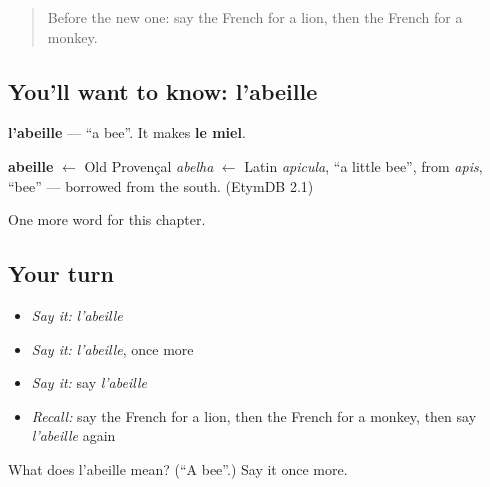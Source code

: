 \begin{quote}
Before the new one: say the French for a lion, then the French for a monkey.
\end{quote}

\subsection*{You'll want to know: l'abeille}
\textbf{l'abeille} — \textquotedblleft{}a bee\textquotedblright{}. It makes \textbf{le miel}.

\begin{cousinweb}
\textbf{abeille} $\leftarrow$ Old Provençal \emph{abelha} $\leftarrow$ Latin \emph{apicula}, \textquotedblleft{}a little bee\textquotedblright{}, from \emph{apis}, \textquotedblleft{}bee\textquotedblright{} — borrowed from the south. (EtymDB 2.1)
\end{cousinweb}

\begin{grammarlens}[title={What you've built}]
One more word for this chapter.
\end{grammarlens}

\subsection*{Your turn}
\begin{itemize}
\raggedright
  \item \emph{Say it:} \emph{l'abeille}
  \item \emph{Say it:} \emph{l'abeille}, once more
  \item \emph{Say it:} say \emph{l'abeille}
  \item \emph{Recall:} say the French for a lion, then the French for a monkey, then say \emph{l'abeille} again
\end{itemize}

\begin{tcolorbox}[breakable,colback=teal!4,colframe=teal!35!black,title={Before you move on}]
What does l'abeille mean? (\textquotedblleft{}A bee\textquotedblright{}.) Say it once more.
\end{tcolorbox}
